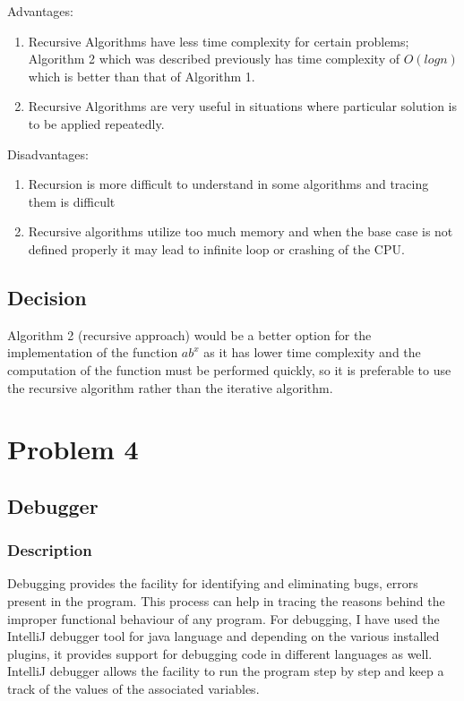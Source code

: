 \documentclass[12pt, a4paper]{article}
\begin{document}
Advantages:
\begin{enumerate}
    \item {Recursive Algorithms have less time complexity for certain problems;  Algorithm 2 which was described previously has time complexity of $O(logn)$ which is better than that of Algorithm 1.}
    \item {Recursive Algorithms are very useful in situations where particular solution is to be applied repeatedly.}
    
\end{enumerate}

Disadvantages:
\begin{enumerate}
    \item {Recursion is more difficult to understand in some algorithms and tracing them is difficult}
    \item {Recursive algorithms utilize too much memory and when the base case is not defined properly it may lead to infinite loop or crashing of the CPU.}
    
\end{enumerate}

\subsection*{Decision}
Algorithm 2 (recursive approach) would be a better option for the implementation of the function $ab^x$ as it has lower time complexity and the computation of the function must be performed quickly, so it is preferable to use the recursive algorithm rather than the iterative algorithm.
\newpage

\section{Problem 4 }
\subsection{Debugger}
\subsubsection{Description}
Debugging provides the facility for identifying and eliminating bugs, errors present in the program. This process can help in tracing the reasons behind the improper functional behaviour of any program. For debugging, I have used the IntelliJ debugger tool for java language and depending on the various installed plugins, it provides support for debugging code in different languages as well. IntelliJ debugger allows the facility to run the program step by step and keep a track of the values of the associated variables.
\end{document}
